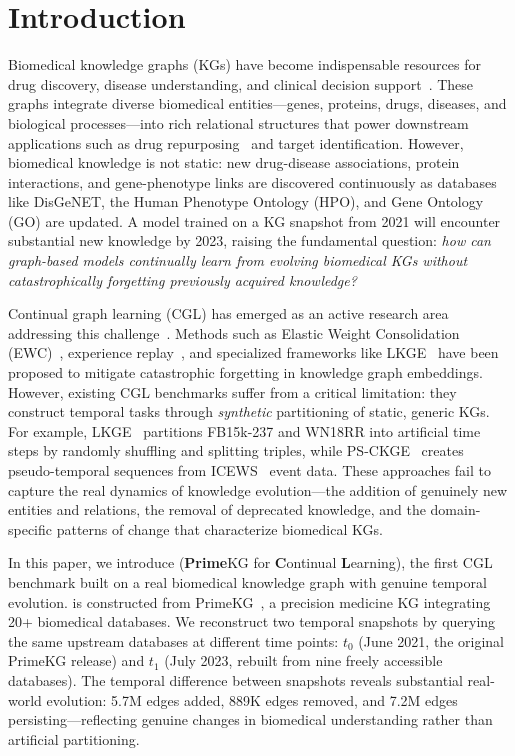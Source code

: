 \section{Introduction}
\label{sec:intro}

Biomedical knowledge graphs (KGs) have become indispensable resources for drug discovery, disease understanding, and clinical decision support~\citep{Chandak2023, Huang2024}.
These graphs integrate diverse biomedical entities---genes, proteins, drugs, diseases, and biological processes---into rich relational structures that power downstream applications such as drug repurposing~\citep{Huang2024} and target identification.
However, biomedical knowledge is not static: new drug-disease associations, protein interactions, and gene-phenotype links are discovered continuously as databases like DisGeNET, the Human Phenotype Ontology (HPO), and Gene Ontology (GO) are updated.
A model trained on a KG snapshot from 2021 will encounter substantial new knowledge by 2023, raising the fundamental question: \emph{how can graph-based models continually learn from evolving biomedical KGs without catastrophically forgetting previously acquired knowledge?}

Continual graph learning (CGL) has emerged as an active research area addressing this challenge~\citep{Daruna2021}.
Methods such as Elastic Weight Consolidation (EWC)~\citep{Kirkpatrick2017}, experience replay~\citep{Rolnick2019}, and specialized frameworks like LKGE~\citep{Cui2023} have been proposed to mitigate catastrophic forgetting in knowledge graph embeddings.
However, existing CGL benchmarks suffer from a critical limitation: they construct temporal tasks through \emph{synthetic} partitioning of static, generic KGs.
For example, LKGE~\citep{Cui2023} partitions FB15k-237 and WN18RR into artificial time steps by randomly shuffling and splitting triples, while PS-CKGE~\citep{Wu2024} creates pseudo-temporal sequences from ICEWS~\citep{GarciaDuran2018} event data.
These approaches fail to capture the real dynamics of knowledge evolution---the addition of genuinely new entities and relations, the removal of deprecated knowledge, and the domain-specific patterns of change that characterize biomedical KGs.

In this paper, we introduce \ours (\textbf{Prime}KG for \textbf{C}ontinual \textbf{L}earning), the first CGL benchmark built on a real biomedical knowledge graph with genuine temporal evolution.
\ours is constructed from PrimeKG~\citep{Chandak2023}, a precision medicine KG integrating 20+ biomedical databases.
We reconstruct two temporal snapshots by querying the same upstream databases at different time points: $t_0$ (June 2021, the original PrimeKG release) and $t_1$ (July 2023, rebuilt from nine freely accessible databases).
The temporal difference between snapshots reveals substantial real-world evolution: 5.7M edges added, 889K edges removed, and 7.2M edges persisting---reflecting genuine changes in biomedical understanding rather than artificial partitioning.


